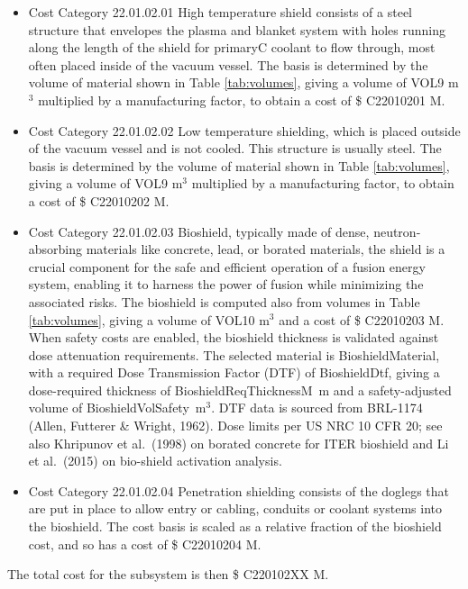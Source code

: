 \begin{itemize}
    \item Cost Category 22.01.02.01 High temperature shield consists of a steel structure that envelopes the plasma and blanket system with holes running along the length of the shield for primaryC coolant to flow through, most often placed inside of the vacuum vessel. The basis is determined by the volume of material shown in Table \ref{tab:volumes}, giving a volume of VOL9  m$^{3}$ multiplied by a manufacturing factor, to obtain a cost of \$ C22010201 M. %
    \item Cost Category 22.01.02.02 Low temperature shielding, which is placed outside of the vacuum vessel and is not cooled.  This structure is usually steel.  The basis is determined by the volume of material shown in Table \ref{tab:volumes}, giving a volume of VOL9 m$^{3}$ multiplied by a manufacturing factor, to obtain a cost of \$ C22010202 M.
    \item Cost Category 22.01.02.03 Bioshield, typically made of dense, neutron-absorbing materials like concrete, lead, or borated materials, the shield is a crucial component for the safe and efficient operation of a fusion energy system, enabling it to harness the power of fusion while minimizing the associated risks.  The bioshield is computed also from volumes in Table \ref{tab:volumes}, giving a volume of VOL10 m$^{3}$ and a cost of \$ C22010203 M.
\ifsafetycosts
    When safety costs are enabled, the bioshield thickness is validated against dose attenuation requirements. The selected material is BioshieldMaterial, with a required Dose Transmission Factor (DTF) of BioshieldDtf, giving a dose-required thickness of BioshieldReqThicknessM~m and a safety-adjusted volume of BioshieldVolSafety~m$^{3}$. DTF data is sourced from BRL-1174 (Allen, Futterer \& Wright, 1962). Dose limits per US NRC 10 CFR 20; see also Khripunov et al.\ (1998) on borated concrete for ITER bioshield and Li et al.\ (2015) on bio-shield activation analysis.
\fi
    \item Cost Category 22.01.02.04 Penetration shielding consists of the doglegs that are put in place to allow entry or cabling, conduits or coolant systems into the bioshield.  The cost basis is scaled as a relative fraction of the bioshield cost, and so has a cost of \$ C22010204 M.
\end{itemize}

The total cost for the subsystem is then \$ C220102XX M.




